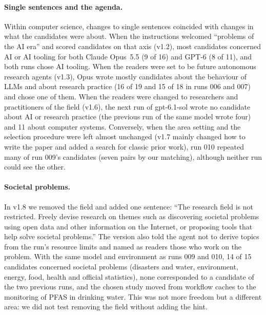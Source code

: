 \documentclass[11pt]{article}
\begin{document}
\paragraph{Single sentences and the agenda.} Within computer science, changes to single sentences coincided with changes in what the candidates were about. When the instructions welcomed ``problems of the AI era'' and scored candidates on that axis (v1.2), most candidates concerned AI or AI tooling for both Claude Opus~5.5 (9 of 16) and GPT-6 (8 of 11), and both runs chose AI tooling. When the readers were set to be future autonomous research agents (v1.3), Opus wrote mostly candidates about the behaviour of LLMs and about research practice (16 of 19 and 15 of 18 in runs 006 and 007) and chose one of them. When the readers were changed to researchers and practitioners of the field (v1.6), the next run of gpt-6.1-sol wrote no candidate about AI or research practice (the previous run of the same model wrote four) and 11 about computer systems. Conversely, when the area setting and the selection procedure were left almost unchanged (v1.7 mainly changed how to write the paper and added a search for classic prior work), run 010 repeated many of run 009's candidates (seven pairs by our matching), although neither run could see the other.

\paragraph{Societal problems.} In v1.8 we removed the field and added one sentence: ``The research field is not restricted. Freely devise research on themes such as discovering societal problems using open data and other information on the Internet, or proposing tools that help solve societal problems.'' The version also told the agent not to derive topics from the run's resource limits and named as readers those who work on the problem. With the same model and environment as runs 009 and 010, 14 of 15 candidates concerned societal problems (disasters and water, environment, energy, food, health and official statistics), none corresponded to a candidate of the two previous runs, and the chosen study moved from workflow caches to the monitoring of PFAS in drinking water. This was not more freedom but a different area: we did not test removing the field without adding the hint.
\end{document}
